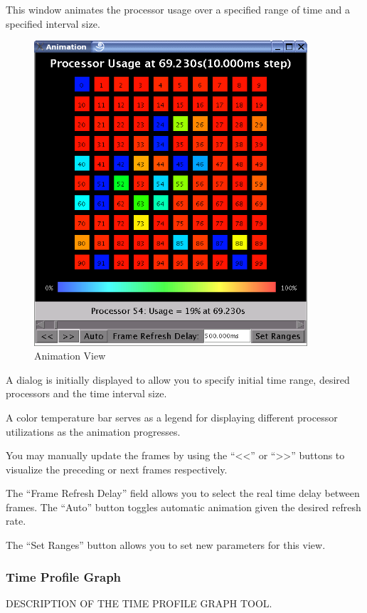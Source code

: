 \documentclass[10pt]{article}
\begin{document}
This window animates the processor usage over a specified range of
time and a specified interval size. 

\begin{figure}[htb]
\center
\includegraphics[width=4.0in]{fig/animation}
\caption{Animation View}
\label{animation}
\end{figure}

A dialog is initially displayed to allow you to specify initial time
range, desired processors and the time interval size.

A color temperature bar serves as a legend for displaying different
processor utilizations as the animation progresses.

You may manually update the frames by using the ``<<'' or ``>>''
buttons to visualize the preceding or next frames respectively.

The ``Frame Refresh Delay'' field allows you to select the real time
delay between frames. The ``Auto'' button toggles automatic animation
given the desired refresh rate.

The ``Set Ranges'' button allows you to set new parameters for this
view.

\subsubsection{Time Profile Graph}

DESCRIPTION OF THE TIME PROFILE GRAPH TOOL.
\end{document}

